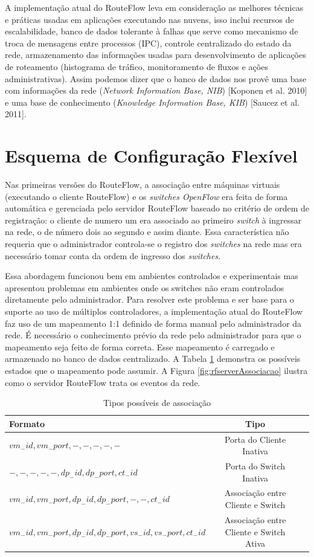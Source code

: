 A implementação atual do RouteFlow leva em consideração
as melhores técnicas e práticas usadas em aplicações executando
nas nuvens, isso inclui recursos de escalabilidade, banco de 
dados tolerante à falhas que serve como mecanismo de troca
de mensagens entre processos (IPC), controle centralizado
do estado da rede, armazenamento das informações usadas 
para desenvolvimento de aplicações de roteamento (histograma 
de tráfico, monitoramento de fluxos e ações administrativas).
Assim podemos dizer que o banco de dados nos provê uma 
base com informações da rede (\textit{Network Information
Base, NIB}) [Koponen et al. 2010] e uma base de conhecimento
 (\textit{Knowledge Information Base, KIB}) [Saucez et al. 2011].

\section{Esquema de Configuração Flexível}

Nas primeiras versões do RouteFlow, a associação entre máquinas
virtuais (executando o cliente RouteFlow) e os \textit{switches OpenFlow}
era feita de forma automática e gerenciada pelo servidor RouteFlow baseado
no critério de ordem de registração: o cliente de numero um
era associado ao primeiro \textit{switch} à ingressar na rede, o de número
dois ao segundo e assim diante. Essa característica não requeria 
que o administrador controla-se o registro dos \textit{switches} na rede mas
era necessário tomar conta da ordem de ingresso dos \textit{switches}.

Essa abordagem funcionou bem em ambientes controlados e 
experimentais mas apresentou problemas em ambientes onde
os switches não eram controlados diretamente pelo administrador.
Para resolver este problema e ser base para o suporte ao uso de
múltiplos controladores, a implementação atual do RouteFlow
faz uso de um mapeamento 1:1 definido de forma manual pelo 
administrador da rede.
É necessário o conhecimento prévio da rede pelo administrador
para que o mapeamento seja feito de forma correta. Esse mapeamento
é carregado e armazenado no banco de dados centralizado.
A Tabela \ref{tab:tipos_associacao} demonstra os possíveis estados que o mapeamento
pode assumir. A Figura \ref{fig:rfserverAssociacao} ilustra como o servidor RouteFlow trata os eventos
da rede.


\begin{table}[h]
\centering
\begin{tabular}{|l|c|c|}
\hline
Formato & Tipo\\
\hline
\hline
$vm_-id,vm_-port,-,-,-,-,-$ & Porta do Cliente Inativa\\
\hline
$-,-,-,-,-,dp_-id,dp_-port,ct_-id$ & Porta do Switch Inativa\\
\hline
$vm_-id,vm_-port,dp_-id,dp_-port,-,-,ct_-id$ & Associação entre Cliente e Switch\\
\hline
$vm_-id,vm_-port,dp_-id,dp_-port,vs_-id,vs_-port,ct_-id$ & Associação entre Cliente e Switch Ativa\\
\hline
\end{tabular}
\caption{Tipos possíveis de associação}
\label{tab:tipos_associacao}
\end{table}


